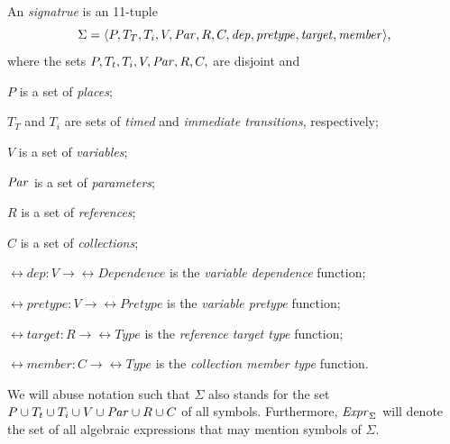 \begin{dfn}\label{dfn:rgspn:rgspn}
  An \emph{ signatrue} is an 11-tuple
  \begin{equation}
    \Sigma = \langle P, T_T, T_i, V, \textrm{\itshape Par\/}, R, C, \textrm{\itshape dep\/}, \textrm{\itshape pretype\/}, \textrm{\itshape target\/}, \textrm{\itshape member\/}\rangle \text,
  \end{equation}
  where the sets \(P, T_t, T_i, V, \textrm{\itshape Par\/}, R, C,\) are disjoint and
  \begin{compactitem}
  \item \(P\) is a set of \emph{places};
  \item \(T_T\) and \(T_i\) are sets of \emph{timed} and \emph{immediate transitions}, respectively;
  \item \(V\) is a set of \emph{variables};
  \item \(\textrm{\itshape Par\/}\) is a set of \emph{parameters};
  \item \(R\) is a set of \emph{references};
  \item \(C\) is a set of \emph{collections};
  \item \(\rel{dep}\colon V \to \rel{Dependence}\) is the \emph{variable dependence} function;
  \item \(\rel{pretype}\colon V \to \rel{Pretype}\) is the \emph{variable pretype} function;
  \item \(\rel{target}\colon R \to \rel{Type}\) is the \emph{reference target type} function;
  \item \(\rel{member}\colon C \to \rel{Type}\) is the \emph{collection member type} function.
  \end{compactitem}
\end{dfn}

We will abuse notation such that \(\Sigma\) also stands for the set \(P \cup T_t \cup T_i \cup V \cup \textrm{\itshape Par\/} \cup R \cup C\) of all symbols. Furthermore, \(\textrm{\itshape Expr\/}_\Sigma\) will denote the set of all algebraic expressions that may mention symbols of \(\Sigma\).

